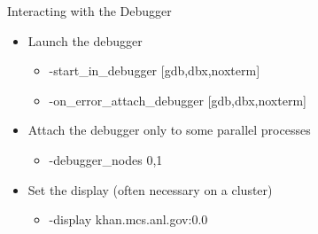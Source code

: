 \begin{frame}{Interacting with the Debugger}

\begin{itemize}
  \item Launch the debugger
  \begin{itemize}
    \item {\kb -start\_in\_debugger  [gdb,dbx,noxterm]}
    \item {\kb -on\_error\_attach\_debugger [gdb,dbx,noxterm]}
  \end{itemize}

  \item Attach the debugger only to some parallel processes
  \begin{itemize}
    \item {\kb -debugger\_nodes 0,1}
  \end{itemize}

  \item Set the display (often necessary on a cluster)
  \begin{itemize}
    \item {\kb -display khan.mcs.anl.gov:0.0}
  \end{itemize}
\end{itemize}

\end{frame}

